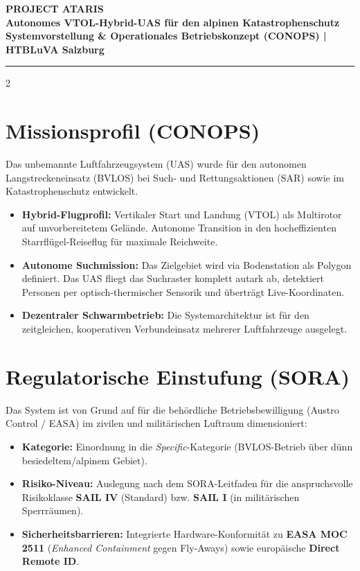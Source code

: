 \documentclass[10pt,a4paper]{article}
\begin{document}
\pagestyle{empty} 

\begin{center}
    {\LARGE\bfseries PROJECT ATARIS} \\[0.1cm]
    {\large\bfseries Autonomes VTOL-Hybrid-UAS für den alpinen Katastrophenschutz} \\[0.05cm]
    {\small\bfseries Systemvorstellung \& Operationales Betriebskonzept (CONOPS) | HTBLuVA Salzburg} \\[0.1cm]
    \rule{\textwidth}{1.2pt}
\end{center}

\begin{multicols}{2}

\section{Missionsprofil (CONOPS)}
Das unbemannte Luftfahrzeugsystem (UAS) wurde für den autonomen Langstreckeneinsatz (BVLOS) bei Such- und Rettungsaktionen (SAR) sowie im Katastrophenschutz entwickelt.
\begin{itemize}
    \item \textbf{Hybrid-Flugprofil:} Vertikaler Start und Landung (VTOL) als Multirotor auf unvorbereitetem Gelände. Autonome Transition in den hocheffizienten Starrflügel-Reiseflug für maximale Reichweite.
    \item \textbf{Autonome Suchmission:} Das Zielgebiet wird via Bodenstation als Polygon definiert. Das UAS fliegt das Suchraster komplett autark ab, detektiert Personen per optisch-thermischer Sensorik und überträgt Live-Koordinaten.
    \item \textbf{Dezentraler Schwarmbetrieb:} Die Systemarchitektur ist für den zeitgleichen, kooperativen Verbundeinsatz mehrerer Luftfahrzeuge ausgelegt.
\end{itemize}

\section{Regulatorische Einstufung (SORA)}
Das System ist von Grund auf für die behördliche Betriebsbewilligung (Austro Control / EASA) im zivilen und militärischen Luftraum dimensioniert:
\begin{itemize}
    \item \textbf{Kategorie:} Einordnung in die \textit{Specific}-Kategorie (BVLOS-Betrieb über dünn besiedeltem/alpinem Gebiet).
    \item \textbf{Risiko-Niveau:} Auslegung nach dem SORA-Leitfaden für die anspruchsvolle Risikoklasse \textbf{SAIL IV} (Standard) bzw. \textbf{SAIL I} (in militärischen Sperrräumen).
    \item \textbf{Sicherheitsbarrieren:} Integrierte Hardware-Konformität zu \textbf{EASA MOC 2511} (\textit{Enhanced Containment} gegen Fly-Aways) sowie europäische \textbf{Direct Remote ID}.
\end{itemize}


\end{multicols}
\end{document}
